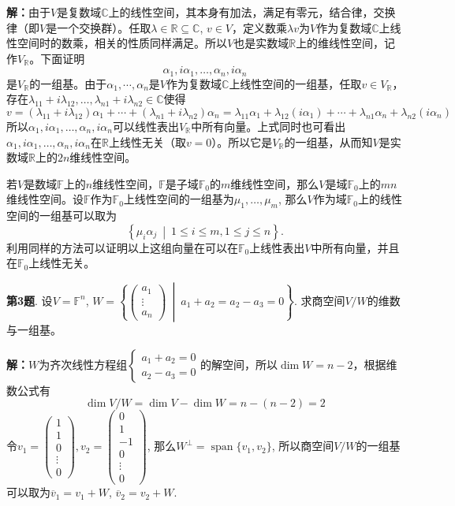 {\bf 解：}由于$V$是复数域$\mathbb{C}$上的线性空间，其本身有加法，满足有零元，结合律，交换律（即$V$是一个交换群）。任取$\lambda \in \mathbb{R} \subseteq \mathbb{C}$, $v\in V$，定义数乘$\lambda v$为$V$作为复数域$\mathbb{C}$上线性空间时的数乘，相关的性质同样满足。所以$V$也是实数域$\mathbb{R}$上的维线性空间，记作$V_{\mathbb{R}}$。下面证明
$$\alpha_1,i\alpha_1,\ldots,\alpha_n,i\alpha_n$$
是$V_{\mathbb{R}}$的一组基。由于$\alpha_1,\cdots,\alpha_n$是$V$作为复数域$\mathbb{C}$上线性空间的一组基，任取$v\in V_{\mathbb{R}}$，存在$\lambda_{11} + i\lambda_{12}, \ldots, \lambda_{n1} + i\lambda_{n2} \in \mathbb{C}$使得
$$v = (\lambda_{11} + i\lambda_{12})\alpha_1 + \cdots + (\lambda_{n1} + i\lambda_{n2})\alpha_n = \lambda_{11}\alpha_1 + \lambda_{12}(i\alpha_1) + \cdots + \lambda_{n1}\alpha_n + \lambda_{n2}(i\alpha_n)$$
所以$\alpha_1,i\alpha_1,\ldots,\alpha_n,i\alpha_n$可以线性表出$V_{\mathbb{R}}$中所有向量。上式同时也可看出$\alpha_1,i\alpha_1,\ldots,\alpha_n,i\alpha_n$在$\mathbb{R}$上线性无关（取$v=0$）。所以它是$V_{\mathbb{R}}$的一组基，从而知$V$是实数域$\mathbb{R}$上的$2n$维线性空间。

若$V$是数域$\mathbb{F}$上的$n$维线性空间，$\mathbb{F}$是子域$\mathbb{F}_0$的$m$维线性空间，那么$V$是域$\mathbb{F}_0$上的$mn$维线性空间。设$\mathbb{F}$作为$\mathbb{F}_0$上线性空间的一组基为$\mu_1, \ldots, \mu_m$, 那么$V$作为域$\mathbb{F}_0$上的线性空间的一组基可以取为
$$\left\{ \mu_i\alpha_j \ \middle|\ 1 \leqslant i \leqslant m, 1 \leqslant j \leqslant n \right\}.$$
利用同样的方法可以证明以上这组向量在可以在$\mathbb{F}_0$上线性表出$V$中所有向量，并且在$\mathbb{F}_0$上线性无关。

\newpageorvspace

{\bf 第3题}. 设$V = \mathbb{F}^n$, $W = \left\{ \begin{pmatrix} a_1 \\ \vdots \\ a_n \end{pmatrix} \ \middle|\ a_1+a_2=a_2-a_3=0 \right\}$. 求商空间$V / W$的维数与一组基。

{\bf 解：}$W$为齐次线性方程组$\begin{cases} a_1+a_2= 0 \\ a_2-a_3=0 \end{cases}$的解空间，所以$\dim W = n-2$，根据维数公式有
$$\dim V/W = \dim V - \dim W = n - (n-2) = 2$$
令$v_1 = \begin{pmatrix} 1 \\ 1 \\ 0 \\ \vdots \\ 0 \end{pmatrix}, v_2 = \begin{pmatrix} 0 \\ 1 \\ -1 \\ 0 \\ \vdots \\ 0 \end{pmatrix}$, 那么$W^{\perp} = \operatorname{span}\{v_1, v_2\}$, 所以商空间$V / W$的一组基可以取为$\overline{v}_1 = v_1 + W$, $\overline{v}_2 = v_2 + W$.


